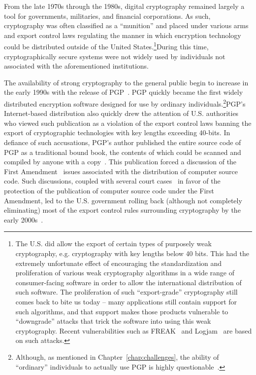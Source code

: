 From the late 1970s through the 1980s, digital cryptography remained
largely a tool for governments, militaries, and financial
corporations. As such, cryptography was often classified as a
``munition'' and placed under various arms and export control laws
regulating the manner in which encryption technology could be
distributed outside of the United States.\footnote{The U.S. did allow
  the export of certain types of purposely weak cryptography, e.g. cryptography
  with key lengths below 40 bits. This had the extremely unfortunate
  effect of encouraging the standardization and proliferation of
  various weak cryptography algorithms in a wide range of consumer-facing
  software in order to allow the international distribution of such
  software. The proliferation of such ``export-grade'' cryptography
  still comes back to bite us today -- many applications still contain
  support for such algorithms, and that support makes those products
  vulnerable to ``downgrade'' attacks that trick the software into
  using this weak cryptography. Recent vulnerabilities such as
  FREAK~\cite{beurdouche2015} and Logjam~\cite{adrian2015} are based
  on such attacks.}During this time, cryptographically secure systems
were not widely used by individuals not associated with the
aforementioned institutions.

The availability of strong cryptography to the general public begin to
increase in the early 1990s with the release of
PGP~\cite{zimmermann-pgp10}. PGP quickly became the first widely
distributed encryption software designed for use by ordinary
individuals.\footnote{Although, as mentioned in
  Chapter~\ref{chap:challenges}, the ability of ``ordinary''
  individuals to actually use PGP is highly
  questionable~\cite{whitten1999}.}PGP's Internet-based distribution
also quickly drew the attention of U.S. authorities who viewed such
publication as a violation of the export control laws banning the
export of cryptographic technologies with key lengths exceeding
40-bits. In defiance of such accusations, PGP's author published the
entire source code of PGP as a traditional bound book, the contents of
which could be scanned and compiled by anyone with a
copy~\cite{zimmermann-pgpsource}. This publication forced a discussion
of the First Amendment~\cite{us-constitution-amend1} issues associated
with the distribution of computer source code. Such discussions,
coupled with several court cases~\cite{ninthcir-bernstein,
  sixthcir-junger} in favor of the protection of the publication of
computer source code under the First Amendment, led to the U.S.
government rolling back (although not completely eliminating) most of
the export control rules surrounding cryptography by the early
2000s~\cite{kehl2015}.

